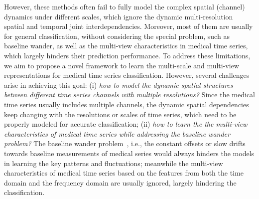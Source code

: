 However, these methods often fail to fully model the complex spatial (channel) dynamics under different scales, which ignore the dynamic multi-resolution spatial and temporal joint interdependencies. Moreover, most of them are usually for general classification, without considering the special problem, such as baseline wander, as well as the multi-view characteristics in medical time series, which largely hinders their prediction performance.
To address these limitations, we aim to propose a novel framework to learn the multi-scale and multi-view representations for medical time series classification. %
However, several challenges arise in achieving this goal: 
(i) \textit{{how to model the dynamic spatial structures between different time series channels with multiple resolutions?}} Since the medical time series usually includes multiple channels, the dynamic spatial dependencies keep changing with the resolutions or scales of time series, which need to be properly modeled for accurate classification;
(ii) \textit{how to learn the the multi-view characteristics of medical time series while addressing the baseline wander problem?} The baseline wander problem~\cite{blanco2008ecg}, i.e., the constant offsets or slow drifts towards baseline measurements of medical series would always hinders the models in learning the key patterns and fluctuations; meanwhile the multi-view characteristics of medical time series based on the features from both the time domain and the frequency domain are usually ignored, largely hindering the classification.


